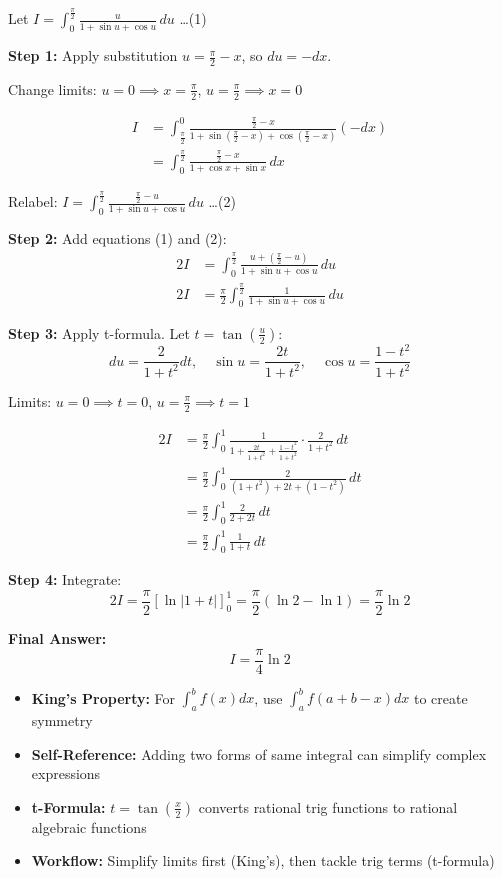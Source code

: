 \begin{solution}
Let $I = \int_0^{\frac{\pi}{2}} \frac{u}{1 + \sin u + \cos u} \, du$ \quad \ldots (1)

\textbf{Step 1:} Apply substitution $u = \frac{\pi}{2} - x$, so $du = -dx$.

Change limits: $u=0 \implies x=\frac{\pi}{2}$, $u=\frac{\pi}{2} \implies x=0$

\begin{align*}
I &= \int_{\frac{\pi}{2}}^{0} \frac{\frac{\pi}{2} - x}{1 + \sin(\frac{\pi}{2} - x) + \cos(\frac{\pi}{2} - x)} (-dx) \\
&= \int_{0}^{\frac{\pi}{2}} \frac{\frac{\pi}{2} - x}{1 + \cos x + \sin x} \, dx
\end{align*}

Relabel: $I = \int_{0}^{\frac{\pi}{2}} \frac{\frac{\pi}{2} - u}{1 + \sin u + \cos u} \, du$ \quad \ldots (2)

\textbf{Step 2:} Add equations (1) and (2):
\begin{align*}
2I &= \int_0^{\frac{\pi}{2}} \frac{u + (\frac{\pi}{2} - u)}{1 + \sin u + \cos u} \, du \\
2I &= \frac{\pi}{2} \int_0^{\frac{\pi}{2}} \frac{1}{1 + \sin u + \cos u} \, du
\end{align*}

\textbf{Step 3:} Apply t-formula. Let $t = \tan(\frac{u}{2})$:
\[
du = \frac{2}{1+t^2}dt, \quad \sin u = \frac{2t}{1+t^2}, \quad \cos u = \frac{1-t^2}{1+t^2}
\]

Limits: $u=0 \implies t=0$, $u=\frac{\pi}{2} \implies t=1$

\begin{align*}
2I &= \frac{\pi}{2} \int_0^{1} \frac{1}{1 + \frac{2t}{1+t^2} + \frac{1-t^2}{1+t^2}} \cdot \frac{2}{1+t^2} \, dt \\
&= \frac{\pi}{2} \int_0^{1} \frac{2}{(1+t^2) + 2t + (1-t^2)} \, dt \\
&= \frac{\pi}{2} \int_0^{1} \frac{2}{2 + 2t} \, dt \\
&= \frac{\pi}{2} \int_0^{1} \frac{1}{1 + t} \, dt
\end{align*}

\textbf{Step 4:} Integrate:
\[
2I = \frac{\pi}{2} [\ln|1+t|]_0^1 = \frac{\pi}{2}(\ln 2 - \ln 1) = \frac{\pi}{2} \ln 2
\]

\textbf{Final Answer:}
\[
\boxed{I = \frac{\pi}{4} \ln 2}
\]
\end{solution}

\begin{takeaways}
\begin{itemize}
\item \textbf{King's Property:} For $\int_a^b f(x)dx$, use $\int_a^b f(a+b-x)dx$ to create symmetry
\item \textbf{Self-Reference:} Adding two forms of same integral can simplify complex expressions
\item \textbf{t-Formula:} $t = \tan(\frac{x}{2})$ converts rational trig functions to rational algebraic functions
\item \textbf{Workflow:} Simplify limits first (King's), then tackle trig terms (t-formula)
\end{itemize}
\end{takeaways}

